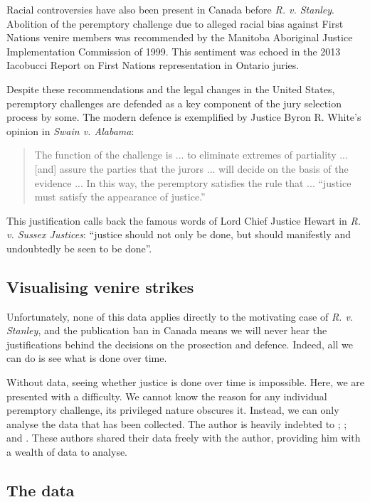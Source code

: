 \documentclass[12pt]{article}
\begin{document}
Racial controversies have also been present in Canada before \textit{R. v. Stanley}. Abolition of the peremptory challenge due to alleged racial bias against First Nations venire members was recommended by the Manitoba Aboriginal Justice Implementation Commission of 1999. This sentiment was echoed in the 2013 Iacobucci Report on First Nations representation in Ontario juries.

Despite these recommendations and the legal changes in the United States, peremptory challenges are defended as a key component of the jury selection process by some. The modern defence is exemplified by Justice Byron R. White's opinion in \emph{Swain v. Alabama}:

\begin{quote}
The function of the challenge is ... to eliminate extremes of partiality ... [and] assure the parties that the jurors ... will decide on the basis of the evidence ... In this way, the peremptory satisfies the rule that ... ``justice must satisfy the appearance of justice.''
\end{quote}

This justification calls back the famous words of Lord Chief Justice Hewart in \textit{R. v. Sussex Justices}: ``justice should not only be done, but should manifestly and undoubtedly be seen to be done''.

\subsection*{Visualising venire strikes}

Unfortunately, none of this data applies directly to the motivating case of \emph{R. v. Stanley}, and the publication ban in Canada means we will never hear the justifications behind the decisions on the prosection and defence. Indeed, all we can do is see what is done over time.

Without data, seeing whether justice is done over time is impossible. Here, we are presented with a difficulty. We cannot know the reason for any individual peremptory challenge, its privileged nature obscures it. Instead, we can only analyse the data that has been collected. The author is heavily indebted to \citeauthor{JurySunshineProj}; \citeauthor{StubbornLegacy}; and \citeauthor{PerempChalMurder}. These authors shared their data freely with the author, providing him with a wealth of data to analyse.


\subsection*{The data}
\end{document}
